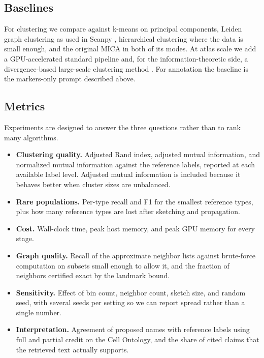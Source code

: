 \subsection{Baselines}
For clustering we compare against k-means on principal components, Leiden graph clustering as used in Scanpy \cite{traag2019louvain}, hierarchical clustering where the data is small enough, and the original MICA in both of its modes. At atlas scale we add a GPU-accelerated standard pipeline \cite{dicks2026rapids} and, for the information-theoretic side, a divergence-based large-scale clustering method \cite{baker2021minicore}. For annotation the baseline is the markers-only prompt described above.

\subsection{Metrics}
Experiments are designed to answer the three questions rather than to rank many algorithms.
\begin{itemize}
\item \textbf{Clustering quality.} Adjusted Rand index, adjusted mutual information, and normalized mutual information against the reference labels, reported at each available label level. Adjusted mutual information is included because it behaves better when cluster sizes are unbalanced.
\item \textbf{Rare populations.} Per-type recall and F1 for the smallest reference types, plus how many reference types are lost after sketching and propagation.
\item \textbf{Cost.} Wall-clock time, peak host memory, and peak GPU memory for every stage.
\item \textbf{Graph quality.} Recall of the approximate neighbor lists against brute-force computation on subsets small enough to allow it, and the fraction of neighbors certified exact by the landmark bound.
\item \textbf{Sensitivity.} Effect of bin count, neighbor count, sketch size, and random seed, with several seeds per setting so we can report spread rather than a single number.
\item \textbf{Interpretation.} Agreement of proposed names with reference labels using full and partial credit on the Cell Ontology, and the share of cited claims that the retrieved text actually supports.
\end{itemize}
